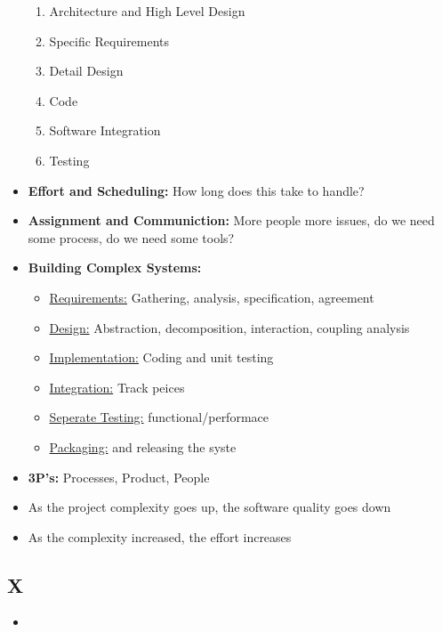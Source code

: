 \documentclass[12pt]{article}
\begin{document}
\begin{itemize}
\begin{enumerate}
					\item Architecture and High Level Design
					\item Specific Requirements
					\item Detail Design
					\item Code
					\item Software Integration
					\item Testing
		  		\end{enumerate}
			\item \textbf{Effort and Scheduling:} How long does this take to handle?
			\item \textbf{Assignment and Communiction:} More people more issues, 
					do we need some process, do we need some tools?
		  \item \textbf{Building Complex Systems:}
		  		\begin{itemize}
					\item \underline{Requirements:} Gathering, analysis, specification, agreement
					\item \underline{Design:} Abstraction, decomposition, interaction, coupling analysis
					\item \underline{Implementation:} Coding and unit testing
					\item \underline{Integration:} Track peices
					\item \underline{Seperate Testing:} functional/performace
					\item \underline{Packaging:} and releasing the syste
				\end{itemize}
			\item \textbf{3P's:} Processes, Product, People
			\item As the project complexity goes up, the software quality goes down
			\item As the complexity increased, the effort increases

\end{itemize}

\subsection*{X}

\begin{itemize}
		  \item 
\end{itemize}
\end{document}
